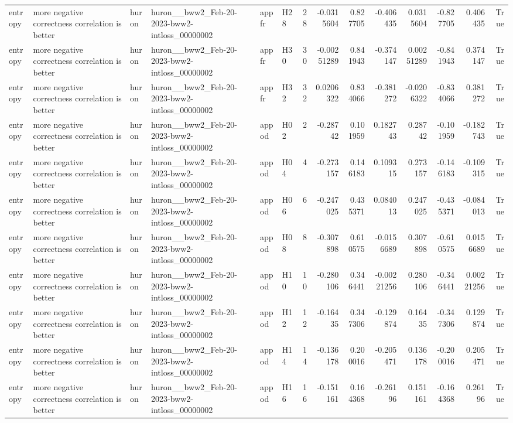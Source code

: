 \begin{longtable}{llllllrrrrrrrr}
entropy & more negative correctness correlation is better & huron & huron\_\_bww2\_Feb-20-2023-bww2-intloss\_00000002 & appfr & H28 & 28 & -0.0315604 & 0.827705 & -0.406435 & 0.0315604 & -0.827705 & 0.406435 & True \\
entropy & more negative correctness correlation is better & huron & huron\_\_bww2\_Feb-20-2023-bww2-intloss\_00000002 & appfr & H30 & 30 & -0.00251289 & 0.841943 & -0.374147 & 0.00251289 & -0.841943 & 0.374147 & True \\
entropy & more negative correctness correlation is better & huron & huron\_\_bww2\_Feb-20-2023-bww2-intloss\_00000002 & appfr & H32 & 32 & 0.0206322 & 0.834066 & -0.381272 & -0.0206322 & -0.834066 & 0.381272 & True \\
entropy & more negative correctness correlation is better & huron & huron\_\_bww2\_Feb-20-2023-bww2-intloss\_00000002 & appod & H02 & 2 & -0.28742 & 0.101959 & 0.182743 & 0.28742 & -0.101959 & -0.182743 & True \\
entropy & more negative correctness correlation is better & huron & huron\_\_bww2\_Feb-20-2023-bww2-intloss\_00000002 & appod & H04 & 4 & -0.273157 & 0.146183 & 0.109315 & 0.273157 & -0.146183 & -0.109315 & True \\
entropy & more negative correctness correlation is better & huron & huron\_\_bww2\_Feb-20-2023-bww2-intloss\_00000002 & appod & H06 & 6 & -0.247025 & 0.435371 & 0.084013 & 0.247025 & -0.435371 & -0.084013 & True \\
entropy & more negative correctness correlation is better & huron & huron\_\_bww2\_Feb-20-2023-bww2-intloss\_00000002 & appod & H08 & 8 & -0.307898 & 0.610575 & -0.0156689 & 0.307898 & -0.610575 & 0.0156689 & True \\
entropy & more negative correctness correlation is better & huron & huron\_\_bww2\_Feb-20-2023-bww2-intloss\_00000002 & appod & H10 & 10 & -0.280106 & 0.346441 & -0.00221256 & 0.280106 & -0.346441 & 0.00221256 & True \\
entropy & more negative correctness correlation is better & huron & huron\_\_bww2\_Feb-20-2023-bww2-intloss\_00000002 & appod & H12 & 12 & -0.16435 & 0.347306 & -0.129874 & 0.16435 & -0.347306 & 0.129874 & True \\
entropy & more negative correctness correlation is better & huron & huron\_\_bww2\_Feb-20-2023-bww2-intloss\_00000002 & appod & H14 & 14 & -0.136178 & 0.200016 & -0.205471 & 0.136178 & -0.200016 & 0.205471 & True \\
entropy & more negative correctness correlation is better & huron & huron\_\_bww2\_Feb-20-2023-bww2-intloss\_00000002 & appod & H16 & 16 & -0.151161 & 0.164368 & -0.26196 & 0.151161 & -0.164368 & 0.26196 & True \\

\end{longtable}
